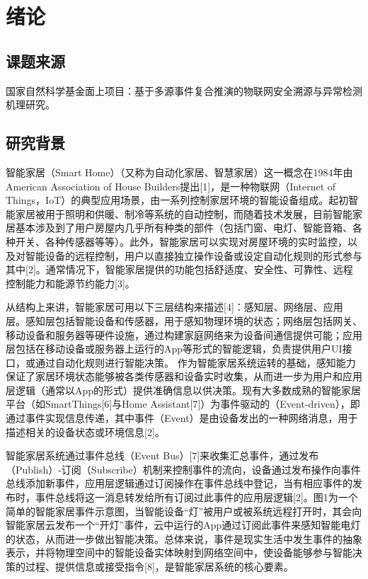 \chapter{绪论}

\section{课题来源}

国家自然科学基金面上项目：基于多源事件复合推演的物联网安全溯源与异常检测机理研究。

\section{研究背景}

智能家居（Smart Home）（又称为自动化家居、智慧家居）这一概念在1984年由American Association of House Builders提出[1]，是一种物联网（Internet of Things，IoT）的典型应用场景，由一系列控制家居环境的智能设备组成。起初智能家居被用于照明和供暖、制冷等系统的自动控制，而随着技术发展，目前智能家居基本涉及到了用户房屋内几乎所有种类的部件（包括门窗、电灯、智能音箱、各种开关、各种传感器等等）。此外，智能家居可以实现对房屋环境的实时监控，以及对智能设备的远程控制，用户以直接独立操作设备或设定自动化规则的形式参与其中[2]。通常情况下，智能家居提供的功能包括舒适度、安全性、可靠性、远程控制能力和能源节约能力[3]。

从结构上来讲，智能家居可用以下三层结构来描述[4]：感知层、网络层、应用层。感知层包括智能设备和传感器，用于感知物理环境的状态；网络层包括网关、移动设备和服务器等硬件设施，通过构建家庭网络来为设备间通信提供可能；应用层包括在移动设备或服务器上运行的App等形式的智能逻辑，负责提供用户UI接口，或通过自动化规则进行智能决策。
作为智能家居系统运转的基础，感知能力保证了家居环境状态能够被各类传感器和设备实时收集，从而进一步为用户和应用层逻辑（通常以App的形式）提供准确信息以供决策。现有大多数成熟的智能家居平台（如SmartThings[6]与Home Assistant[7]）为事件驱动的（Event-driven），即通过事件实现信息传递，其中事件（Event）是由设备发出的一种网络消息，用于描述相关的设备状态或环境信息[2]。

智能家居系统通过事件总线（Event Bus）[7]来收集汇总事件，通过发布（Publish）-订阅（Subscribe）机制来控制事件的流向，设备通过发布操作向事件总线添加新事件，应用层逻辑通过订阅操作在事件总线中登记，当有相应事件的发布时，事件总线将这一消息转发给所有订阅过此事件的应用层逻辑[2]。图1为一个简单的智能家居事件示意图，当智能设备“灯”被用户或被系统远程打开时，其会向智能家居云发布一个“开灯”事件，云中运行的App通过订阅此事件来感知智能电灯的状态，从而进一步做出智能决策。总体来说，事件是现实生活中发生事件的抽象表示，并将物理空间中的智能设备实体映射到网络空间中，使设备能够参与智能决策的过程、提供信息或接受指令[8]，是智能家居系统的核心要素。

